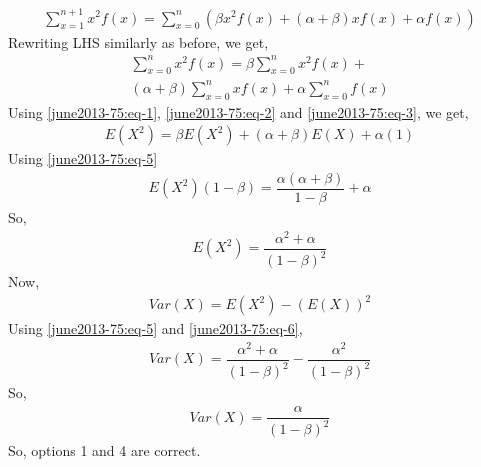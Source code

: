 \begin{align}
    \sum_{x=1}^{n+1}x^2f(x)=\sum_{x=0}^n(\beta x^2f(x) + (\alpha+\beta)xf(x) + \alpha f(x))
\end{align}
Rewriting LHS similarly as before, we get,
\begin{align}
    \sum_{x=0}^nx^2f(x)=\beta \sum_{x=0}^nx^2f(x) + \nonumber \\
    (\alpha + \beta)\sum_{x=0}^nxf(x) + \alpha \sum_{x=0}^nf(x)
\end{align}
Using \eqref{june2013-75:eq-1}, \eqref{june2013-75:eq-2} and \eqref{june2013-75:eq-3}, we get,
\begin{align}
    E(X^2)=\beta E(X^2) + (\alpha + \beta)E(X) + \alpha (1) 
\end{align}
Using \eqref{june2013-75:eq-5}
\begin{align}
    E(X^2)(1-\beta)=\dfrac{\alpha(\alpha+\beta)}{1-\beta} + \alpha
\end{align}
So,
\begin{align} \label{june2013-75:eq-6}
    E(X^2)=\dfrac{\alpha^2+\alpha}{(1-\beta)^2}
\end{align}
Now,
\begin{align}
    Var(X)=E(X^2)-(E(X))^2
\end{align}
Using \eqref{june2013-75:eq-5} and \eqref{june2013-75:eq-6},
\begin{align}
    Var(X)=\dfrac{\alpha^2+\alpha}{(1-\beta)^2}-\dfrac{\alpha^2}{(1-\beta)^2}
\end{align}
So,
\begin{align}
    Var(X)=\dfrac{\alpha}{(1-\beta)^2}
\end{align}
So, options 1 and 4 are correct.